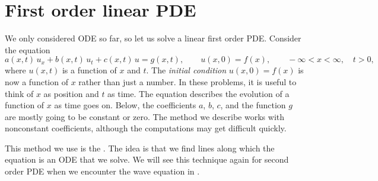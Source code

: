 \sectionnewpage
\section{First order linear PDE}
\label{fopde:section}



We only considered ODE so far, so let us solve a linear first order
PDE\@.  Consider the equation
\begin{equation*}
a(x,t) \, u_x + b(x,t) \, u_t + c(x,t) \, u = g(x,t), \qquad u(x,0) = f(x) , \qquad -\infty < x < \infty,
\quad t > 0 ,
\end{equation*}
where $u(x,t)$ is a function of $x$ and $t$.
The \emph{initial condition}
$u(x,0) = f(x)$ is now a function of $x$ rather than just a number.
In these problems, it is useful to think of $x$ as position and $t$ as time.
The equation describes the evolution of a function of $x$ as
time goes on.
Below, the coefficients $a$, $b$, $c$, and the function $g$
are mostly going to be constant or zero.  
The method we describe works with nonconstant coefficients,
although the computations may get difficult quickly.

This method we use is the
\emph{}.
The idea is that we find lines along which the equation is
an ODE that we solve.
We will see this technique again for second order PDE
when we encounter the wave equation in .

